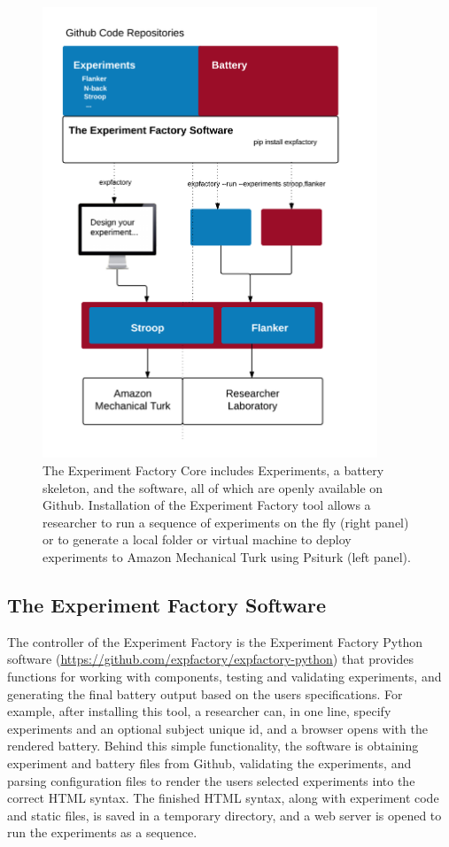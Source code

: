 \documentclass{report}
\begin{document}
\begin{figure}[ht!]
\begin{center}
\includegraphics[width=10cm]{images/figure41.png}%
\end{center}
\caption{\label{fig:41} The Experiment Factory Core includes Experiments, a battery skeleton, and the software, all of which are openly available on Github. Installation of the Experiment Factory tool allows a researcher to run a sequence of experiments on the fly (right panel) or to generate a local folder or virtual machine to deploy experiments to Amazon Mechanical Turk using Psiturk (left panel).}
\end{figure}

\subsection{The Experiment Factory Software}

The controller of the Experiment Factory is the Experiment Factory
Python software \newline (\href{https://github.com/expfactory/expfactory-python}{https://github.com/expfactory/expfactory-python}) that
provides functions for working with components, testing and validating
experiments, and generating the final battery output based on the users
specifications. For example, after installing this tool, a researcher
can, in one line, specify experiments and an optional subject unique id,
and a browser opens with the rendered battery. Behind this simple
functionality, the software is obtaining experiment and battery files
from Github, validating the experiments, and parsing configuration files
to render the users selected experiments into the correct HTML syntax.
The finished HTML syntax, along with experiment code and static files,
is saved in a temporary directory, and a web server is opened to run the
experiments as a sequence.
\end{document}
